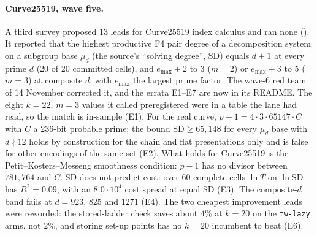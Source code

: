 \paragraph{Curve25519, wave five.} A third survey proposed 13 leads for
Curve25519 index calculus and ran none
(). It reported
that the highest productive F4 pair degree of a decomposition system on a
subgroup base $\mu_d$ (the source's ``solving degree'', SD) equals $d+1$ at
every prime $d$ (20 of 20 committed cells), and $e_{\max}+2$ to $3$ ($m=2$)
or $e_{\max}+3$ to $5$ ($m=3$) at composite $d$, with $e_{\max}$ the
largest prime factor. The wave-6 red team of 14 November corrected it, and
the errata E1--E7 are now in its README. The eight $k=22$, $m=3$ values it
called preregistered were in a table the lane had read, so the match is
in-sample (E1). For the real curve, $p-1=4\cdot3\cdot65147\cdot C$ with $C$
a 236-bit probable prime; the bound $\mathrm{SD}\ge65{,}148$ for every
$\mu_d$ base with $d\nmid12$ holds by construction for the chain and flat
presentations only and is false for other encodings of the same set (E2).
What holds for Curve25519 is the Petit--Kosters--Messeng smoothness
condition: $p-1$ has no divisor between $781{,}764$ and $C$. SD does not
predict cost: over 60 complete cells $\ln T$ on $\ln\mathrm{SD}$ has
$R^2=0.09$, with an $8.0\cdot10^4$ cost spread at equal SD (E3). The
composite-$d$ band fails at $d=923$, $825$ and $1271$ (E4). The two
cheapest improvement leads were reworded: the stored-ladder check saves
about $4\%$ at $k=20$ on the \texttt{tw-lazy} arms, not $2\%$, and storing
set-up points has no $k=20$ incumbent to beat (E6).

